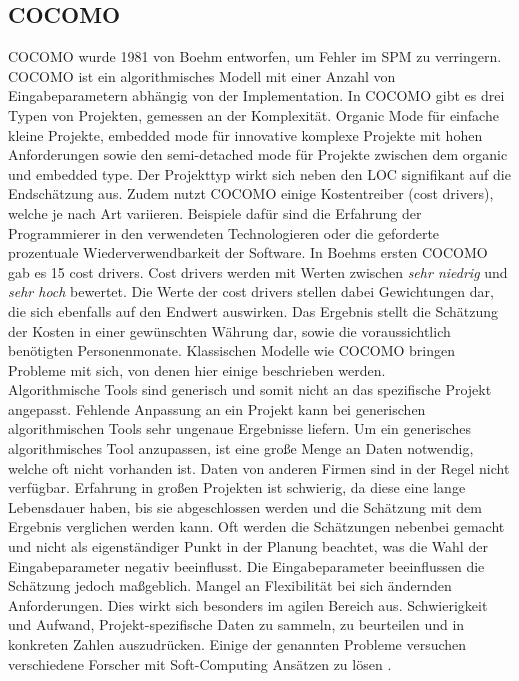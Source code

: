 \subsection{COCOMO}
 COCOMO wurde 1981 von Boehm entworfen, um Fehler im SPM zu verringern. COCOMO ist ein algorithmisches Modell mit einer Anzahl von Eingabeparametern abhängig von der Implementation. In COCOMO gibt es drei Typen von Projekten, gemessen an der Komplexität. Organic Mode für einfache kleine Projekte, embedded mode für innovative komplexe Projekte mit hohen Anforderungen sowie den semi-detached mode für Projekte zwischen dem organic und embedded type. Der Projekttyp wirkt sich neben den LOC signifikant auf die Endschätzung aus. Zudem nutzt COCOMO einige Kostentreiber (cost drivers), welche je nach Art variieren. Beispiele dafür sind die Erfahrung der Programmierer in den verwendeten Technologieren oder die geforderte prozentuale Wiederverwendbarkeit der Software. In Boehms ersten COCOMO gab es 15 cost drivers. Cost drivers werden mit Werten zwischen \textit{sehr niedrig} und \textit{sehr hoch} bewertet. Die Werte der cost drivers stellen dabei Gewichtungen dar, die sich ebenfalls auf den Endwert auswirken. Das Ergebnis stellt die Schätzung der Kosten in einer gewünschten Währung dar, sowie die voraussichtlich benötigten Personenmonate. Klassischen Modelle wie COCOMO bringen Probleme mit sich, von denen hier einige beschrieben werden.
 \\
Algorithmische Tools sind generisch und somit nicht an das spezifische Projekt angepasst. Fehlende Anpassung an ein Projekt kann bei generischen algorithmischen Tools sehr ungenaue Ergebnisse liefern. Um ein generisches algorithmisches Tool anzupassen, ist eine große Menge an Daten notwendig, welche oft nicht vorhanden ist. Daten von anderen Firmen sind in der Regel nicht verfügbar. Erfahrung in großen Projekten ist schwierig, da diese eine lange Lebensdauer haben, bis sie abgeschlossen werden und die Schätzung mit dem Ergebnis verglichen werden kann. Oft werden die Schätzungen nebenbei gemacht und nicht als eigenständiger Punkt in der Planung beachtet, was die Wahl der Eingabeparameter negativ beeinflusst. Die Eingabeparameter beeinflussen die Schätzung jedoch maßgeblich. Mangel an Flexibilität bei sich ändernden Anforderungen. Dies wirkt sich besonders im agilen Bereich aus. Schwierigkeit und Aufwand, Projekt-spezifische Daten zu sammeln, zu beurteilen und in konkreten Zahlen auszudrücken. Einige der genannten Probleme versuchen verschiedene Forscher mit Soft-Computing Ansätzen zu lösen \cite{Bilgaiyan2016}\cite{Chen2005}\cite{Heemstra1992}\cite{Abrahamsson2007}.
\vspace{6.0cm}

